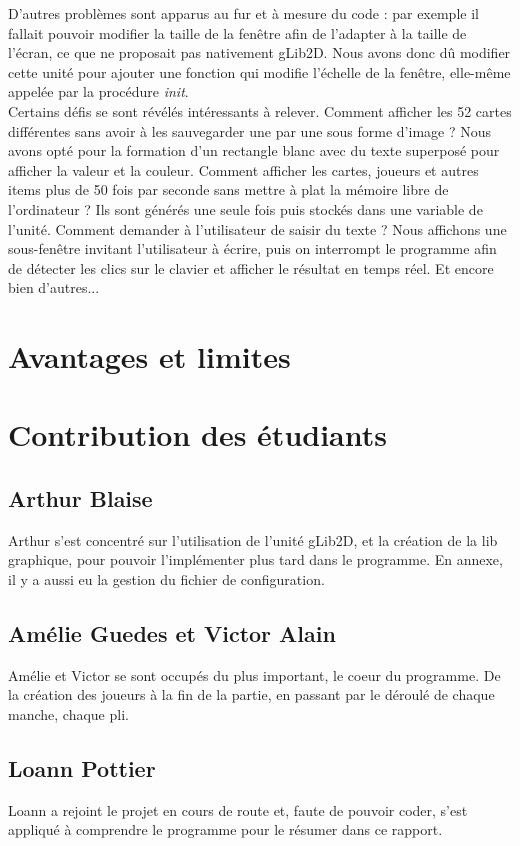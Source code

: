 \documentclass[12pt]{report}
\begin{document}
	D'autres problèmes sont apparus au fur et à mesure du code : par exemple il fallait pouvoir modifier la taille de la fenêtre afin de l'adapter à la taille de l'écran, ce que ne proposait pas nativement gLib2D. Nous avons donc dû modifier cette unité pour ajouter une fonction qui modifie l'échelle de la fenêtre, elle-même appelée par la procédure \textit{init}. \\
	\clearpage
	Certains défis se sont révélés intéressants à relever. Comment afficher les 52 cartes différentes sans avoir à les sauvegarder une par une sous forme d'image ? Nous avons opté pour la formation d'un rectangle blanc avec du texte superposé pour afficher la valeur et la couleur. Comment afficher les cartes, joueurs et autres items plus de 50 fois par seconde sans mettre à plat la mémoire libre de l'ordinateur ? Ils sont générés une seule fois puis stockés dans une variable de l'unité. Comment demander à l'utilisateur de saisir du texte ? Nous affichons une sous-fenêtre invitant l'utilisateur à écrire, puis on interrompt le programme afin de détecter les clics sur le clavier et afficher le résultat en temps réel. Et encore bien d'autres...

\vspace{15pt}
\section{Avantages et limites}


\section{Contribution des étudiants}
\subsection*{Arthur Blaise}
	Arthur s'est concentré sur l'utilisation de l'unité gLib2D, et la création de la lib graphique, pour pouvoir l'implémenter plus tard dans le programme. En annexe, il y a aussi eu la gestion du fichier de configuration.
	
\subsection*{Amélie Guedes et Victor Alain}
 Amélie et Victor se sont occupés du plus important, le coeur du programme. De la création des joueurs à la fin de la partie, en passant par le déroulé de chaque manche, chaque pli. 
 
\subsection*{Loann Pottier}
Loann a rejoint le projet en cours de route et, faute de pouvoir coder, s'est appliqué à comprendre le programme pour le résumer dans ce rapport.
\end{document}

